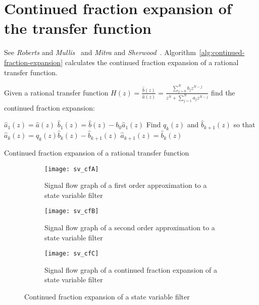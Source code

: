 \documentclass[a4paper,twoside,10pt,english]{report}
\begin{document}
\section{\label{sec:Continued-fraction-expansion}Continued fraction expansion of the transfer function}
See \emph{Roberts} and
\emph{Mullis}~\cite[Problems 8.16, 10.13 to 10.16]{RobertsMullis_DigitalSignalProcessing} 
and \emph{Mitra} and 
\emph{Sherwood}~\cite{MitraSherwood_DigitalFiltersContinuedFraction}.
Algorithm~\ref{alg:continued-fraction-expansion} calculates the continued
fraction expansion of a rational transfer function. 

\begin{algorithm}[!hb]
Given a rational transfer function
$H\left(z\right) = \frac{\hat{b}\left(z\right)}{\hat{a}\left(z\right)} =
\frac{\sum^{N}_{j=0}b_{j}z^{N-j}}{z^{N}+\sum^{N}_{j=1}a_{j}z^{N-j}}$ find the
continued fraction expansion:
\begin{algorithmic}
\State $\hat{a}_{1}\left(z\right) = \hat{a}\left(z\right)$
\State $\hat{b}_{1}\left(z\right) = \hat{b}\left(z\right) - b_{0}\hat{a}_{1}\left(z\right)$
  \State Find $q_{k}\left(z\right)$ and $\hat{b}_{k+1}\left(z\right)$ so that
     $\hat{a}_{k}\left(z\right) = 
       q_{k}\left(z\right)\hat{b}_{k}\left(z\right)-\hat{b}_{k+1}\left(z\right)$
  \State $\hat{a}_{k+1}\left(z\right) = \hat{b}_{k}\left(z\right)$
\EndFor
\end{algorithmic}
\caption{Continued fraction expansion of a rational transfer function}
\label{alg:continued-fraction-expansion}
\end{algorithm}

\begin{figure}[!hb]
\begin{center}
\begin{subfigure}{\textwidth}
\begin{center}
\texttt{[image: sv\_cfA]}
\caption{Signal flow graph of a first order approximation to a state variable filter}
\label{subfig:SV-CF-A}
\vspace{1cm}
\end{center}
\end{subfigure}
\begin{subfigure}{\textwidth}
\begin{center}
\texttt{[image: sv\_cfB]}
\caption{Signal flow graph of a second order approximation to a state variable filter}
\label{subfig:SV-CF-B}
\vspace{1cm}
\end{center}
\end{subfigure}
\begin{subfigure}{\textwidth}
\begin{center}
\texttt{[image: sv\_cfC]}
\caption{Signal flow graph of a continued fraction expansion of a state variable filter}
\label{subfig:SV-CF-C}
\end{center}
\end{subfigure}
\caption{Continued fraction expansion of a state variable filter}
\label{fig:continued-fraction-state-variable-filter}
\end{center}
\end{figure}
\end{document}
